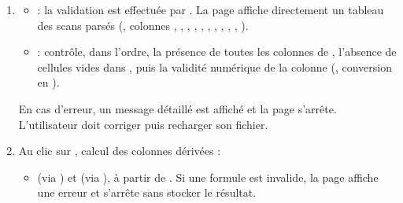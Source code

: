\documentclass[letterpaper,10pt,english]{sphinxmanual}
\begin{document}
\begin{enumerate}
\begin{itemize}
\end{itemize}

\sphinxAtStartPar
Le chargement d’un nouveau fichier efface les clés  (résultats
calculés en aval) ainsi que la donnée de l’autre niveau MS ( si l’on
bascule vers ,  si l’on bascule vers ), tout en
conservant les réglages de l’étape 1.

\item {} 
\sphinxAtStartPar
{}
\begin{itemize}
\item {} 
\sphinxAtStartPar
{} : la validation est effectuée par . La page affiche
directement un tableau des scans parsés (,
colonnes , , ,
, , , ,
, , , ).

\item {} 
\sphinxAtStartPar
{} : contrôle, dans l’ordre, la présence de toutes les colonnes de
, l’absence de cellules vides dans
, puis la validité numérique de la colonne
 (, conversion en ).

\end{itemize}

\sphinxAtStartPar
En cas d’erreur, un message détaillé est affiché et la page s’arrête.
L’utilisateur doit corriger puis recharger son fichier.

\item {} 
\sphinxAtStartPar
{}
Au clic sur , calcul des colonnes dérivées :
\begin{itemize}
\item {} 
\sphinxAtStartPar
{} (via {\hyperref[\detokenize{api:utils.molecular_weight.molecular_weight}]{}})
et  (via {\hyperref[\detokenize{api:utils.monoisotopic.monoisotopic_mass}]{}}),
à partir de . Si une formule est invalide, la page affiche une erreur et s’arrête sans stocker le
résultat.


\end{itemize}
\end{enumerate}
\end{document}
